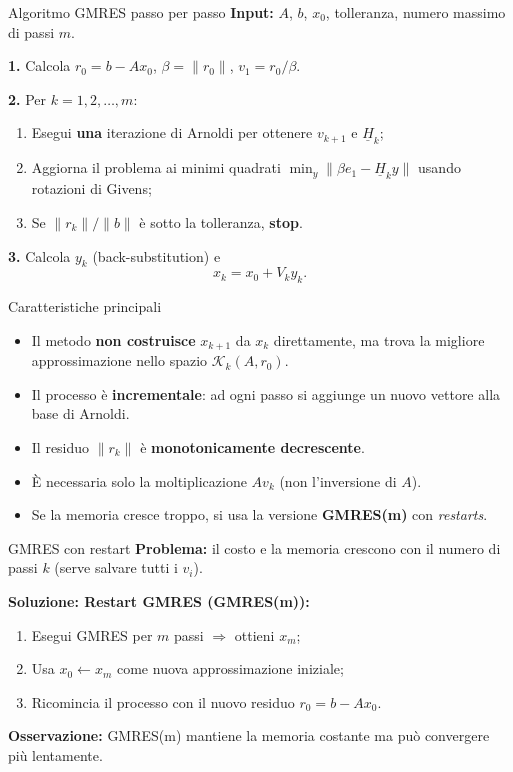 \documentclass[aspectratio=169]{beamer}
\begin{document}
\begin{frame}{Algoritmo GMRES passo per passo}
\textbf{Input:} $A$, $b$, $x_0$, tolleranza, numero massimo di passi $m$.

\medskip
\textbf{1.} Calcola $r_0 = b - A x_0$, $\beta = \|r_0\|$, $v_1 = r_0 / \beta$.

\textbf{2.} Per $k = 1,2,\dots,m$:
\begin{enumerate}
  \item Esegui \textbf{una} iterazione di Arnoldi per ottenere $v_{k+1}$ e $\underline{H}_k$;
  \item Aggiorna il problema ai minimi quadrati
        $\min_y \|\beta e_1 - \underline{H}_k y\|$
        usando rotazioni di Givens;
  \item Se $\|r_k\|/\|b\|$ è sotto la tolleranza, \textbf{stop}.
\end{enumerate}

\textbf{3.} Calcola $y_k$ (back-substitution) e
\[
x_k = x_0 + V_k y_k.
\]
\end{frame}

\begin{frame}{Caratteristiche principali}
\begin{itemize}
  \item Il metodo \textbf{non costruisce} $x_{k+1}$ da $x_k$ direttamente,
        ma trova la migliore approssimazione nello spazio $\mathcal{K}_k(A,r_0)$.
  \item Il processo è \textbf{incrementale}:
        ad ogni passo si aggiunge un nuovo vettore alla base di Arnoldi.
  \item Il residuo $\|r_k\|$ è \textbf{monotonicamente decrescente}.
  \item È necessaria solo la moltiplicazione $A v_k$ (non l’inversione di $A$).
  \item Se la memoria cresce troppo, si usa la versione \textbf{GMRES(m)} con \emph{restarts}.
\end{itemize}
\end{frame}

\begin{frame}{GMRES con restart}
\textbf{Problema:} il costo e la memoria crescono con il numero di passi $k$ (serve salvare tutti i $v_i$).

\medskip
\textbf{Soluzione: Restart GMRES (GMRES(m)):}
\begin{enumerate}
  \item Esegui GMRES per $m$ passi $\Rightarrow$ ottieni $x_m$;
  \item Usa $x_0 \leftarrow x_m$ come nuova approssimazione iniziale;
  \item Ricomincia il processo con il nuovo residuo $r_0=b-Ax_0$.
\end{enumerate}

\textbf{Osservazione:} GMRES(m) mantiene la memoria costante ma può convergere più lentamente.
\end{frame}
\end{document}
